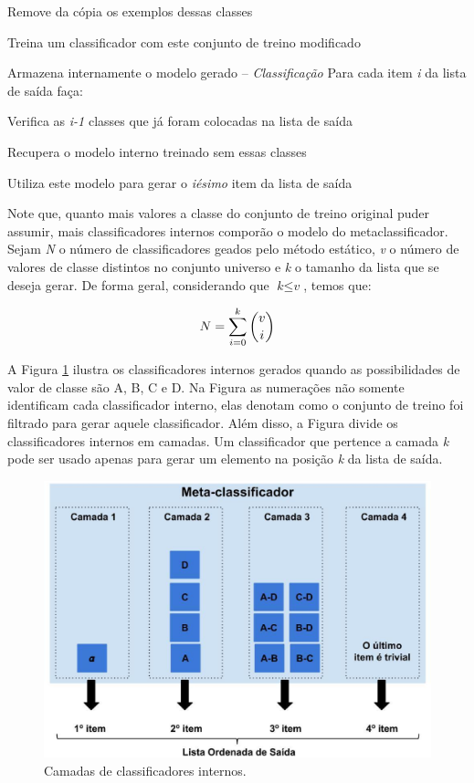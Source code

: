 \quad Remove da cópia os exemplos dessas classes

\quad Treina um classificador com este conjunto de treino modificado

\quad Armazena internamente o modelo gerado\newline
-- \textit{Classificação}\newline
Para cada item \textit{i} da lista de saída faça:

\quad Verifica as \textit{i-1} classes que já foram colocadas na lista de saída

\quad Recupera o modelo interno treinado sem essas classes

\quad Utiliza este modelo para gerar o \textit{iésimo} item da lista de saída

\hline
\hfill \break

Note que, quanto mais valores a classe do conjunto de treino original puder assumir, mais classificadores internos comporão o modelo do metaclassificador.
Sejam \textit{N} o número de classificadores geados pelo método estático, \textit{v} o número de valores de classe distintos no conjunto universo e \textit{k} o tamanho da lista que se deseja gerar. 
De forma geral, considerando que $\textit{k} \leq \textit{v}$, temos que:

\begin{equation*}

\centering
\textit{N} = \sum\limits_{i=0}^k \binom{v}{i}

\end{equation*}

A Figura \ref{fig:metodoproposto03} ilustra os classificadores internos gerados quando as possibilidades de valor de classe são A, B, C e D. Na Figura as numerações não somente identificam cada classificador interno, elas denotam como o conjunto de treino foi filtrado para gerar aquele classificador. Além disso, a Figura divide os classificadores internos em camadas. Um classificador que pertence a camada \textit{k} pode ser usado apenas para gerar um elemento na posição \textit{k} da lista de saída.

\begin{figure}[h!]
  \includegraphics[width=\linewidth]{images/metodoproposto03.eps}
  \caption{Camadas de classificadores internos.}
  \label{fig:metodoproposto03}
\end{figure}

